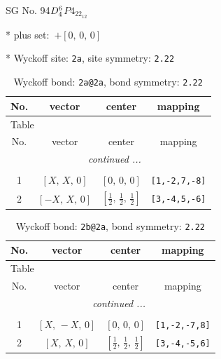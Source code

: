 \documentclass[fleqn,8pt]{jsarticle}
\begin{document}
\setcounter{MaxMatrixCols}{32}

\renewcommand{\tablename}{Table~}
\renewcommand{\figurename}{Figure~}
\begin{center}
\LARGE
SG No. 94\quad$D_{\rm 4}^{6}$\quad$P4_22_12$\quad[ tetragonal ]
\end{center}

* plus set:\,\,\,$+\left[ 0,\, 0,\, 0 \right]$


* Wyckoff site: {\tt 2a}, site symmetry: {\tt 2.22}
\renewcommand{\arraystretch}{1.2}
\begin{longtable}{cccc}
\caption{Wyckoff bond: {\tt 2a@2a}, bond symmetry: {\tt 2.22}}
 \\
 \hline \hline
No. & vector & center & mapping \\ \hline \endfirsthead

\multicolumn{3}{l}{\tablename\ \thetable{}} \\
 \hline \hline
No. & vector & center & mapping \\ \hline \endhead

 \hline \hline
\multicolumn{3}{r}{\footnotesize\it continued ...} \\ \endfoot

 \hline \hline
\multicolumn{3}{r}{} \\ \endlastfoot

1 & $\left[ X,\, X,\, 0 \right]$ & $\left[ 0,\, 0,\, 0 \right]$ & {\tt [1,-2,7,-8]} \\ \hline
2 & $\left[ - X,\, X,\, 0 \right]$ & $\left[ \frac{1}{2},\, \frac{1}{2},\, \frac{1}{2} \right]$ & {\tt [3,-4,5,-6]} \\
\end{longtable}
\renewcommand{\arraystretch}{1.2}
\begin{longtable}{cccc}
\caption{Wyckoff bond: {\tt 2b@2a}, bond symmetry: {\tt 2.22}}
 \\
 \hline \hline
No. & vector & center & mapping \\ \hline \endfirsthead

\multicolumn{3}{l}{\tablename\ \thetable{}} \\
 \hline \hline
No. & vector & center & mapping \\ \hline \endhead

 \hline \hline
\multicolumn{3}{r}{\footnotesize\it continued ...} \\ \endfoot

 \hline \hline
\multicolumn{3}{r}{} \\ \endlastfoot

1 & $\left[ X,\, - X,\, 0 \right]$ & $\left[ 0,\, 0,\, 0 \right]$ & {\tt [1,-2,-7,8]} \\ \hline
2 & $\left[ X,\, X,\, 0 \right]$ & $\left[ \frac{1}{2},\, \frac{1}{2},\, \frac{1}{2} \right]$ & {\tt [3,-4,-5,6]} \\
\end{longtable}
\end{document}
